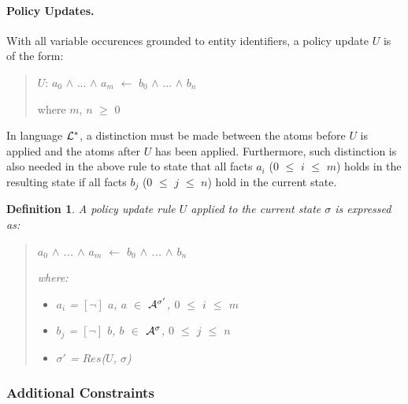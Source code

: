 \documentclass[10pt, twocolumn]{article}
\newtheorem{definition}{Definition}
\begin{document}
        \paragraph{Policy Updates.}

          With all variable occurences grounded to entity identifiers, a
          policy update $U$ is of the form:

          \begin{quote}
            $U$: $a_{0}$ $\land$ ... $\land$ $a_{m}$ $\leftarrow$ $b_{0}$ $\land$ ... $\land$ $b_{n}$

            where $m$, $n$ $\geq$ $0$
          \end{quote}

          In language ${\cal L}^{*}$, a distinction must be made between the
          atoms before $U$ is applied and the atoms after $U$ has been applied.
          Furthermore, such distinction is also needed in the above rule to
          state that all facts $a_{i}$ ($0$ $\leq$ $i$ $\leq$ $m$) holds in
          the resulting state if all facts $b_{j}$ ($0$ $\leq$ $j$ $\leq$ $n$)
          hold in the current state.

          \begin{definition}
            A policy update rule $U$ applied to the current state $\sigma$ is
            expressed as:

            \begin{quote}
              $a_{0}$ $\land$ ... $\land$ $a_{m}$ $\leftarrow$ $b_{0}$ $\land$ ... $\land$ $b_{n}$

              where:

              \begin{itemize}
                \item
                  $a_{i}$ = $[\lnot]$ $a$, $a$ $\in$ ${\cal A}^{\sigma'}$, $0$ $\leq$ $i$ $\leq$ $m$
                \item
                  $b_{j}$ = $[\lnot]$ $b$, $b$ $\in$ ${\cal A}^{\sigma}$, $0$ $\leq$ $j$ $\leq$ $n$
                \item
                  $\sigma'$ = $Res$($U$, $\sigma$)
              \end{itemize}
            \end{quote}
          \end{definition}

      \subsubsection{Additional Constraints}
\end{document}
